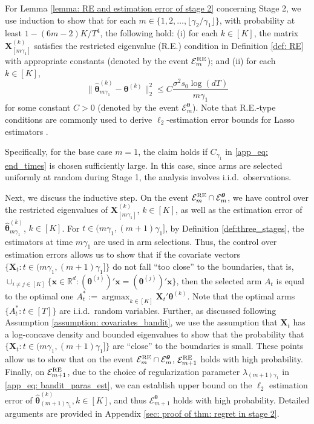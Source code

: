 \documentclass[aos,preprint]{imsart}
\theoremstyle{plain}
\theoremstyle{definition}
\newcommand{\btheta}{\boldsymbol{\theta}}
\newcommand{\hbtheta}{\widehat{\boldsymbol{\theta}}}
\newcommand{\bX}{\boldsymbol{X}}
\DeclareMathOperator*{\argmax}{argmax}
\newcommand{\mE}{\mathcal{E}}
\newcommand{\bx}{\boldsymbol{x}}
\newcommand{\bR}{\mathbb{R}}
\begin{document}
\begin{appendix}
For Lemma \ref{lemma: RE and estimation error of stage 2} concerning Stage 2, we use induction to show that for each $m \in \{1, 2, \dots, \lfloor \gamma_2 / \gamma_1 \rfloor\}$, with probability at least $1 - (6m - 2)K / T^4$, the following hold:  
(i) for each $k \in [K]$, the matrix $\bX_{[m\gamma_1]}^{(k)}$ satisfies the restricted eigenvalue (R.E.) condition in Definition \ref{def: RE} with appropriate constants (denoted by the event $\mE_m^{\textup{RE}}$); and  
(ii) for each $k \in [K]$,  
\[
\| \widehat{\btheta}_{m\gamma_1}^{(k)} - \btheta^{(k)} \|_2^2 \leq C \frac{\sigma^2 s_0 \log(dT)}{m \gamma_1}
\]  
for some constant $C > 0$ (denoted by the event  $\mE_m^{\btheta}$). Note that R.E.-type conditions are commonly used to derive $\ell_2$-estimation error bounds for Lasso estimators \cite{wainwright2019high}.


Specifically, for the base case $m = 1$, the claim holds if $C_{\gamma_1}$ in \eqref{app_eq: end_times} is chosen sufficiently large. In this case, since arms are selected uniformly at random during Stage 1, the analysis involves i.i.d.~observations. 

Next, we discuss the inductive step. On the event $\mE_m^{\textup{RE}} \cap \mE_m^{\btheta}$, we have control over the restricted eigenvalues of $\bX_{[m\gamma_1]}^{(k)}$, $k \in [K]$, as well as the estimation error of $\widehat{\btheta}_{m\gamma_1}^{(k)}$, $k \in [K]$. For $t \in (m\gamma_1, (m+1)\gamma_1]$, by Definition \ref{def:three_stages}, the estimators at time $m\gamma_1$ are used in arm selections.  Thus, the control over estimation errors allows us to show that if the covariate vectors $\{\bX_t : t \in (m\gamma_1, (m+1)\gamma_1]\}$ do not fall ``too close'' to the boundaries, that is, $\cup_{i \neq j \in [K]} \{ \bx \in \bR^d : (\btheta^{(i)})'\bx = (\btheta^{(j)})'\bx \}$, then the selected arm $A_t$ is equal to the optimal one $A_t^* := \argmax_{k \in [K]} \bX_t'\btheta^{(k)}$. Note that the optimal arms $\{A_t^* : t \in [T]\}$ are i.i.d.~random variables. Further, as discussed following Assumption \ref{assumption: covariates_bandit}, we use the assumption that $\bX_t$ has a log-concave density and bounded eigenvalues to show that the probability that $\{\bX_t : t \in (m\gamma_1, (m+1)\gamma_1]\}$ are ``close'' to the boundaries is small.  
These points allow us to show that on the event $\mE_m^{\textup{RE}} \cap \mE_m^{\btheta}$, $\mE_{m+1}^{\textup{RE}}$ holds with high probability. Finally, on $\mE_{m+1}^{\textup{RE}}$, due to the choice of regularization parameter $\lambda_{(m+1)\gamma_1}$ in \eqref{app_eq: bandit_paras_est}, we can establish upper bound on the $\ell_2$ estimation error of $\hbtheta^{(k)}_{(m+1)\gamma_1}, k \in [K]$, and thus $\mE_{m+1}^{\btheta}$ holds with high probability. Detailed arguments are provided in Appendix \ref{sec: proof of thm: regret in stage 2}.



\end{appendix}
\end{document}

